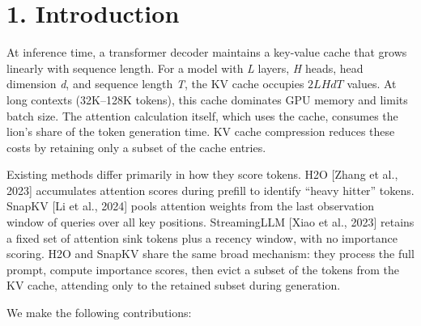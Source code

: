 \documentclass[10pt,letterpaper]{article}
\begin{document}
\hypertarget{introduction}{%
\section{1. Introduction}\label{introduction}}

At inference time, a transformer decoder maintains a key-value cache
that grows linearly with sequence length. For a model with \emph{L}
layers, \emph{H} heads, head dimension \emph{d}, and sequence length
\emph{T}, the KV cache occupies \emph{\(2LHdT\)} values. At long
contexts (32K--128K tokens), this cache dominates GPU memory and limits
batch size. The attention calculation itself, which uses the cache,
consumes the lion's share of the token generation time. KV cache
compression reduces these costs by retaining only a subset of the cache
entries.

Existing methods differ primarily in how they score tokens. H2O {[}Zhang
et al., 2023{]} accumulates attention scores during prefill to identify
``heavy hitter'' tokens. SnapKV {[}Li et al., 2024{]} pools attention
weights from the last observation window of queries over all key
positions. StreamingLLM {[}Xiao et al., 2023{]} retains a fixed set of
attention sink tokens plus a recency window, with no importance scoring.
H2O and SnapKV share the same broad mechanism: they process the full
prompt, compute importance scores, then evict a subset of the tokens
from the KV cache, attending only to the retained subset during
generation.

We make the following contributions:
\end{document}
